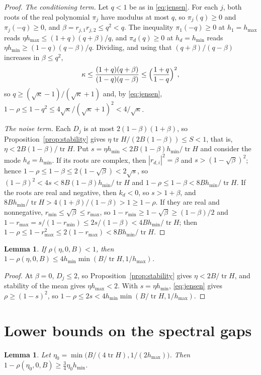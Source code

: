 \documentclass[11pt]{amsart}
\newtheorem{lemma}[theorem]{Lemma}
\theoremstyle{definition}
\theoremstyle{remark}
\numberwithin{equation}{section}
\newcommand{\tr}{\operatorname{tr}}
\newcommand{\hmax}{h_{\max}}
\newcommand{\hmin}{h_{\min}}
\begin{document}
\begin{proof}
\emph{The conditioning term.} Let $q<1$ be as in \eqref{eq:jensen}. For each $j$, both roots of the real polynomial $\pi_j$ have modulus at most $q$, so $\pi_j(q)\ge0$ and $\pi_j(-q)\ge0$, and $\beta=r_{j,1}r_{j,2}\le q^2<q$. The inequality $\pi_{1}(-q)\ge0$ at $h_1=\hmax$ reads $\eta\hmax\le(1+q)(q+\beta)/q$, and $\pi_{d}(q)\ge0$ at $h_d=\hmin$ reads $\eta\hmin\ge(1-q)(q-\beta)/q$. Dividing, and using that $(q+\beta)/(q-\beta)$ increases in $\beta\le q^2$,
\[
\kappa\le\frac{(1+q)(q+\beta)}{(1-q)(q-\beta)}\le\Bigl(\frac{1+q}{1-q}\Bigr)^2,
\]
so $q\ge(\sqrt\kappa-1)/(\sqrt\kappa+1)$ and, by \eqref{eq:jensen}, $1-\rho\le1-q^2\le4\sqrt\kappa/(\sqrt\kappa+1)^2<4/\sqrt\kappa$.

\emph{The noise term.} Each $D_j$ is at most $2(1-\beta)(1+\beta)$, so Proposition~\ref{prop:stability} gives $\eta\tr H/(2B(1-\beta))\le S<1$, that is, $\eta<2B(1-\beta)/\tr H$. Put $s=\eta\hmin<2B(1-\beta)\hmin/\tr H$ and consider the mode $h_d=\hmin$. If its roots are complex, then $|r_{d,i}|^2=\beta$ and $s>(1-\sqrt\beta)^2$; hence $1-\rho\le1-\beta\le2(1-\sqrt\beta)<2\sqrt s$, so $(1-\beta)^2<4s<8B(1-\beta)\hmin/\tr H$ and $1-\rho\le1-\beta<8B\hmin/\tr H$. If the roots are real and negative, then $k_d<0$, so $s>1+\beta$, and $8B\hmin/\tr H>4(1+\beta)/(1-\beta)>1\ge1-\rho$. If they are real and nonnegative, $r_{\min}\le\sqrt\beta\le r_{\max}$, so $1-r_{\min}\ge1-\sqrt\beta\ge(1-\beta)/2$ and $1-r_{\max}=s/(1-r_{\min})\le2s/(1-\beta)<4B\hmin/\tr H$; then $1-\rho\le1-r_{\max}^2\le2(1-r_{\max})<8B\hmin/\tr H$.
\end{proof}

\begin{lemma}\label{lem:sgdupper}
If $\rho(\eta,0,B)<1$, then $1-\rho(\eta,0,B)\le4\hmin\min(B/\tr H,1/\hmax)$.
\end{lemma}

\begin{proof}
At $\beta=0$, $D_j\le2$, so Proposition~\ref{prop:stability} gives $\eta<2B/\tr H$, and stability of the mean gives $\eta\hmax<2$. With $s=\eta\hmin$, \eqref{eq:jensen} gives $\rho\ge(1-s)^2$, so $1-\rho\le2s<4\hmin\min(B/\tr H,1/\hmax)$.
\end{proof}

\section{Lower bounds on the spectral gaps}\label{sec:tuning}

\begin{lemma}\label{lem:sgdlower}
Let $\eta_0=\min\bigl(B/(4\tr H),1/(2\hmax)\bigr)$. Then $1-\rho(\eta_0,0,B)\ge\frac34\eta_0\hmin$.
\end{lemma}
\end{document}
